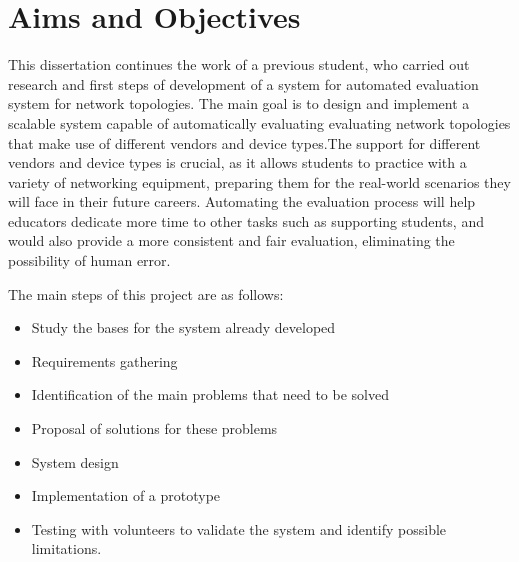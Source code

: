 \section{Aims and Objectives}
This dissertation continues the work of a previous student, who carried out research and first steps of development of a 
system for automated evaluation system for network topologies\cite{santos2024}. The main goal is to design and implement a 
scalable system capable of automatically evaluating evaluating network topologies that make use of different vendors and 
device types.The support for different vendors and device types is crucial, as it allows students to practice with a variety 
of networking equipment, preparing them for the real-world scenarios they will face in their future careers.
Automating the evaluation process will help educators dedicate more time to other tasks such as supporting students, and
would also provide a more consistent and fair evaluation, eliminating the possibility of human error.


The main steps of this project are as follows:

\begin{itemize}
    \item Study the bases for the system already developed
    \item Requirements gathering
    \item Identification of the main problems that need to be solved
    \item Proposal of solutions for these problems
    \item System design
    \item Implementation of a prototype
    \item Testing with volunteers to validate the system and identify possible limitations.
  \end{itemize}
